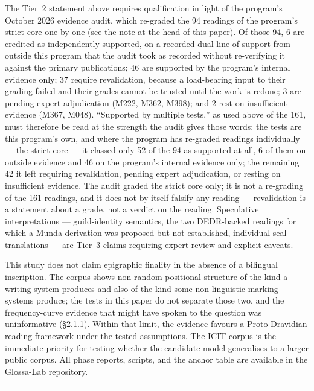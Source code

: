 \documentclass[
]{article}
\begin{document}
The Tier~2 statement above requires qualification in light of the program's October 2026 evidence audit, which re-graded the 94 readings of the program's strict core one by one (see the note at the head of this paper). Of those 94, 6 are credited as independently supported, on a recorded dual line of support from outside this program that the audit took as recorded without re-verifying it against the primary publications; 46 are supported by the program's internal evidence only; 37 require revalidation, because a load-bearing input to their grading failed and their grades cannot be trusted until the work is redone; 3 are pending expert adjudication (M222, M362, M398); and 2 rest on insufficient evidence (M367, M048). ``Supported by multiple tests,'' as used above of the 161, must therefore be read at the strength the audit gives those words: the tests are this program's own, and where the program has re-graded readings individually --- the strict core --- it classed only 52 of the 94 as supported at all, 6 of them on outside evidence and 46 on the program's internal evidence only; the remaining 42 it left requiring revalidation, pending expert adjudication, or resting on insufficient evidence. The audit graded the strict core only; it is not a re-grading of the 161 readings, and it does not by itself falsify any reading --- revalidation is a statement about a grade, not a verdict on the reading.
 Speculative
interpretations --- guild-identity semantics, the two DEDR-backed readings for which a Munda derivation was proposed but not established,
individual seal translations --- are Tier~3 claims requiring expert
review and explicit caveats.

This study does not claim epigraphic finality in the absence of a
bilingual inscription. The corpus shows non-random positional structure of the kind a writing system produces and also of the kind some non-linguistic marking systems produce; the tests in this paper do not separate those two, and the frequency-curve evidence that might have spoken to the question was uninformative (§2.1.1). Within that limit, the evidence favours a Proto-Dravidian reading framework under the tested assumptions. The ICIT corpus
is the immediate
priority for testing whether the candidate model generalises to a larger public corpus. All phase
reports, scripts, and the anchor table are available in the Glossa-Lab repository.

\begin{center}\rule{0.5\linewidth}{0.5pt}\end{center}
\end{document}
